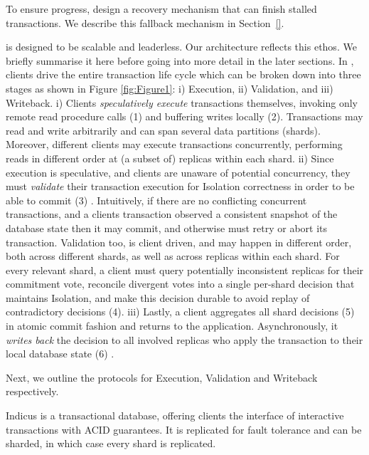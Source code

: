 \par {} To ensure progress, design a recovery mechanism that can finish stalled transactions. We describe this fallback mechanism in Section~\ref{}.

\sys is designed to be scalable and leaderless. Our architecture reflects this ethos. We briefly summarise it here before going into more detail in the later sections. 
In \sys, clients drive the entire transaction life cycle which can be broken down into three stages as shown in Figure \ref{fig:Figure1}: i) Execution, ii) Validation, and iii) Writeback. 
i) Clients \textit{speculatively execute} transactions themselves, invoking only remote read procedure calls (1) and buffering writes locally (2). Transactions may read and write arbitrarily and can span several data partitions (shards). Moreover, different clients may execute transactions concurrently, performing reads in different order at (a subset of) replicas within each shard. 
ii) Since execution is speculative, and clients are unaware of potential concurrency, they must \textit{validate} their transaction execution for Isolation correctness in order to be able to commit (3) . Intuitively, if there are no conflicting concurrent transactions, and a clients transaction observed a consistent snapshot of the database state then it may commit, and otherwise must retry or abort its transaction. Validation too, is client driven, and may happen in different order, both across different shards, as well as across replicas within each shard. For every relevant shard, a client must query potentially inconsistent replicas for their commitment vote, reconcile divergent votes into a single per-shard decision that maintains Isolation, and make this decision durable to avoid replay of contradictory decisions (4). 
iii) Lastly, a client aggregates all shard decisions (5) in atomic commit fashion and returns to the application. Asynchronously, it \textit{writes back} the decision to all involved replicas who apply the transaction to their local database state (6) .

Next, we outline the protocols for Execution, Validation and Writeback respectively. 

\iffalse
{}
Indicus is a transactional database, offering clients the interface of interactive transactions with ACID guarantees. It is replicated for fault tolerance and can be sharded, in which case every shard is replicated. 

